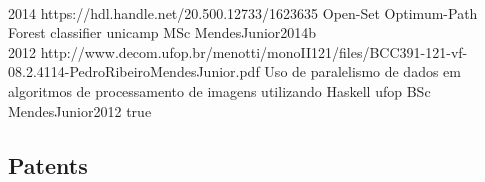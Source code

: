 \begin{publications}
  \\

  {2014}
  {https://hdl.handle.net/20.500.12733/1623635}
  {Open-Set Optimum-Path Forest classifier}
  {unicamp}
  {MSc}
  {MendesJunior2014b}
  {}
  \\

  {2012}
  {http://www.decom.ufop.br/menotti/monoII121/files/BCC391-121-vf-08.2.4114-PedroRibeiroMendesJunior.pdf}
  {Uso de paralelismo de dados em algoritmos de processamento de imagens utilizando Haskell}
  {ufop}
  {BSc}
  {MendesJunior2012}
  {true}
  \\

\end{publications}

\subsection*{Patents}

